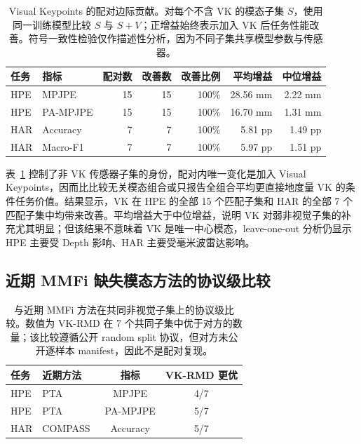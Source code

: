 \documentclass[journal]{IEEEtran}
\begin{document}
\begin{table}[!t]
    \centering
    \caption{Visual Keypoints 的配对边际贡献。对每个不含 VK 的模态子集 $S$，使用同一训练模型比较 $S$ 与 $S+V$；正增益始终表示加入 VK 后任务性能改善。符号一致性检验仅作描述性分析，因为不同子集共享模型参数与传感器。}
    \label{tab:vk_paired_marginal}
    \begin{tabular}{llrrrrr}
        \toprule
        任务 & 指标 & 配对数 & 改善数 & 改善比例 & 平均增益 & 中位增益 \\
        \midrule
        HPE & MPJPE & 15 & 15 & 100\% & 28.56 mm & 2.22 mm \\
        HPE & PA-MPJPE & 15 & 15 & 100\% & 16.70 mm & 1.31 mm \\
        HAR & Accuracy & 7 & 7 & 100\% & 5.81 pp & 1.49 pp \\
        HAR & Macro-F1 & 7 & 7 & 100\% & 5.97 pp & 1.51 pp \\
        \bottomrule
    \end{tabular}
\end{table}

表~\ref{tab:vk_paired_marginal} 控制了非 VK 传感器子集的身份，配对内唯一变化是加入 Visual Keypoints，因而比比较无关模态组合或只报告全组合平均更直接地度量 VK 的条件任务价值。结果显示，VK 在 HPE 的全部 15 个匹配子集和 HAR 的全部 7 个匹配子集中均带来改善。平均增益大于中位增益，说明 VK 对弱非视觉子集的补充尤其明显；但该结果不意味着 VK 是唯一中心模态，leave-one-out 分析仍显示 HPE 主要受 Depth 影响、HAR 主要受毫米波雷达影响。

\subsection{近期 MMFi 缺失模态方法的协议级比较}

\begin{table}[!t]
    \centering
    \caption{与近期 MMFi 方法在共同非视觉子集上的协议级比较。数值为 VK-RMD 在 7 个共同子集中优于对方的数量；该比较遵循公开 random split 协议，但对方未公开逐样本 manifest，因此不是配对复现。}
    \label{tab:recent_mmfi}
    \begin{tabular}{llcc}
        \toprule
        任务 & 近期方法 & 指标 & VK-RMD 更优 \\
        \midrule
        HPE & PTA~\cite{pta2026} & MPJPE & 4/7 \\
        HPE & PTA~\cite{pta2026} & PA-MPJPE & 5/7 \\
        HAR & COMPASS~\cite{compass2026} & Accuracy & 5/7 \\
        \bottomrule
    \end{tabular}
\end{table}
\end{document}
